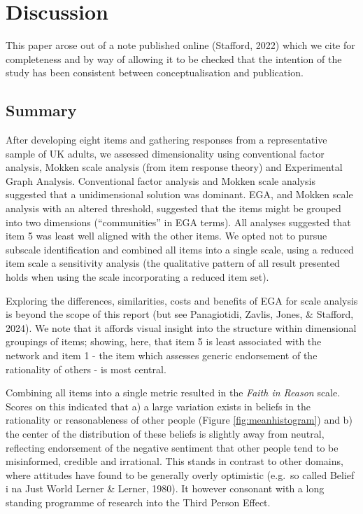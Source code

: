 \documentclass[
  ,jou,floatsintext]{apa6}
\begin{document}
\hypertarget{discussion}{%
\section{Discussion}\label{discussion}}

This paper arose out of a note published online (Stafford, 2022) which we cite for completeness and by way of allowing it to be checked that the intention of the study has been consistent between conceptualisation and publication.

\hypertarget{summary-1}{%
\subsection{Summary}\label{summary-1}}

After developing eight items and gathering responses from a representative sample of UK adults, we assessed dimensionality using conventional factor analysis, Mokken scale analysis (from item response theory) and Experimental Graph Analysis. Conventional factor analysis and Mokken scale analysis suggested that a unidimensional solution was dominant. EGA, and Mokken scale analysis with an altered threshold, suggested that the items might be grouped into two dimensions (``communities'' in EGA terms). All analyses suggested that item 5 was least well aligned with the other items. We opted not to pursue subscale identification and combined all items into a single scale, using a reduced item scale a sensitivity analysis (the qualitative pattern of all result presented holds when using the scale incorporating a reduced item set).

Exploring the differences, similarities, costs and benefits of EGA for scale analysis is beyond the scope of this report (but see Panagiotidi, Zavlis, Jones, \& Stafford, 2024). We note that it affords visual insight into the structure within dimensional groupings of items; showing, here, that item 5 is least associated with the network and item 1 - the item which assesses generic endorsement of the rationality of others - is most central.

Combining all items into a single metric resulted in the \emph{Faith in Reason} scale. Scores on this indicated that a) a large variation exists in beliefs in the rationality or reasonableness of other people (Figure \ref{fig:meanhistogram}) and b) the center of the distribution of these beliefs is slightly away from neutral, reflecting endorsement of the negative sentiment that other people tend to be misinformed, credible and irrational. This stands in contrast to other domains, where attitudes have found to be generally overly optimistic (e.g.~so called Belief i na Just World Lerner \& Lerner, 1980). It however consonant with a long standing programme of research into the Third Person Effect.
\end{document}
